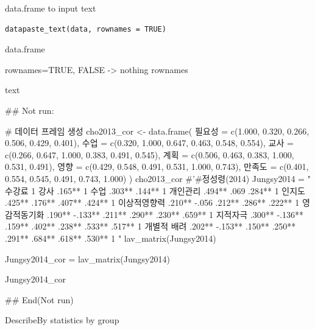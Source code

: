 \documentclass[a4paper]{book}
\begin{document}
%
\begin{Description}
data.frame to input text
\end{Description}
%
\begin{Usage}
\begin{verbatim}
datapaste_text(data, rownames = TRUE)
\end{verbatim}
\end{Usage}
%
\begin{Arguments}
\begin{ldescription}
\item[\code{data}] data.frame

\item[\code{rownames}] rownames=TRUE, FALSE -> nothing rownames
\end{ldescription}
\end{Arguments}
%
\begin{Value}
text
\end{Value}
%
\begin{Examples}
\begin{ExampleCode}

\#\# Not run: 

# 데이터 프레임 생성
cho2013_cor <- data.frame(
  필요성 = c(1.000, 0.320, 0.266, 0.506, 0.429, 0.401),
  수업 = c(0.320, 1.000, 0.647, 0.463, 0.548, 0.554),
  교사 = c(0.266, 0.647, 1.000, 0.383, 0.491, 0.545),
  계획 = c(0.506, 0.463, 0.383, 1.000, 0.531, 0.491),
  영향 = c(0.429, 0.548, 0.491, 0.531, 1.000, 0.743),
  만족도 = c(0.401, 0.554, 0.545, 0.491, 0.743, 1.000)
)
cho2013_cor %
#'#정성령(2014)
Jungsy2014 = "
수강료 1
강사 .165** 1
수업 .303** .144** 1
개인관리 .494** .069 .284** 1
인지도 .425** .176** .407** .424** 1
이상적영향력 .210** -.056 .212** .286** .222** 1
영감적동기화 .190** -.133** .211** .290** .230** .659** 1
지적자극 .300** -.136** .159** .402** .238** .533** .517** 1
개별적 배려 .202** -.153** .150** .250** .291** .684** .618** .530** 1
"
lav_matrix(Jungsy2014)

Jungsy2014_cor = lav_matrix(Jungsy2014)

Jungsy2014_cor %

## End(Not run)

\end{ExampleCode}
\end{Examples}
%
\begin{Description}
DescribeBy  statistics by group
\end{Description}
\end{document}
